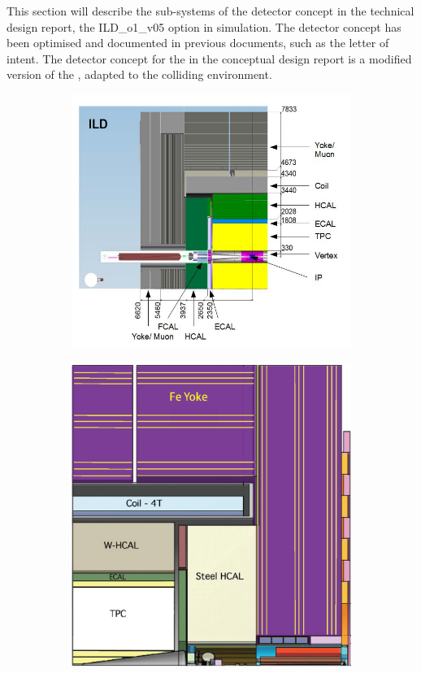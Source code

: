This section will describe the sub-systems of the \ILD detector concept in the \ILD technical design report\cite{}, the ILD\_o1\_v05 option in \Mokka simulation. The detector concept has been optimised and documented in previous documents, such as the letter of intent\cite{}. The \CLICILD detector concept for the \CLIC in the conceptual design report\cite{} is a modified version of the \ILD, adapted to the \CLIC colliding environment.
\begin{figure}[tdbph]
\centering
  \begin{subfigure}[b]{0.45\textwidth}
    \includegraphics[width=\textwidth]{ILD/ILD}
    \caption{}
    \label{fig:ILD}
  \end{subfigure}
  \begin{subfigure}[b]{0.35\textwidth}
    \includegraphics[width=\textwidth]{ILD/CLIC_ILD}

\end{subfigure}
\end{figure}

